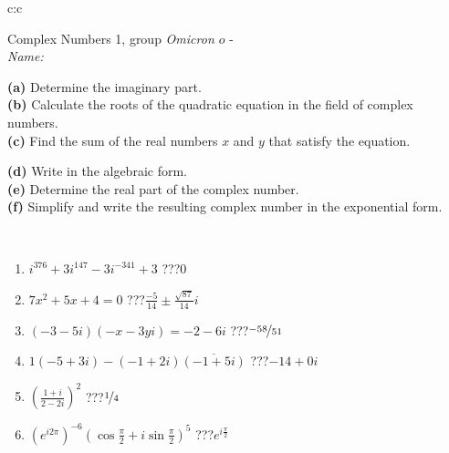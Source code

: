 \documentclass[10pt]{report}
\newcommand\omicron{o}
\begin{document}
\begin{tabular}{c:c}
\begin{minipage}[c][104.5mm][t]{0.5\linewidth}
\begin{center}
\vspace{5mm}
{\huge Complex Numbers 1, group \textit{Omicron $\omicron$} -}\\[5mm]
\textit{Name:}\phantom{xxxxxxxxxxxxxxxxxxxxxxxxxxxxxxxxxxxxxxxxxxxxxxxxxxxxxxxxxxxxxxxxx}\\[5mm]
\begin{minipage}{0.95\linewidth}
\begin{center}
{\small \begin{minipage}{0.44\textwidth} \raggedright
\textbf{(a)} Determine the imaginary part. \\[1mm]
\textbf{(b)} Calculate the roots of the quadratic equation in the field of complex numbers. \\[1mm]
\textbf{(c)} Find the sum of the real numbers \(x\) and \(y\) that satisfy the equation. \end{minipage} \begin{minipage}{0.54\textwidth}
\textbf{(d)} Write in the algebraic form. \\[1mm]
\textbf{(e)} Determine the real part of the complex number. \\[1mm]
\textbf{(f)} Simplify and write the resulting complex number in the exponential form.
\end{minipage}
} \vspace{3mm}
\end{center}
\end{minipage}
\\[1mm]
\begin{minipage}{0.79\linewidth}
\begin{center}
\begin{varwidth}{\linewidth}
\setlength{\itemsep}{0pt}
\begin{enumerate}
\large
\item $i^{376}+3i^{147}-3i^{-341}+3$\quad \dotfill\; ???\;\dotfill \quad $0$
\item $7x^2+5x+4=0$\quad \dotfill\; ???\;\dotfill \quad $\frac{-5}{14} \pm{}\frac{ \sqrt{87}}{14}i$
\item $(-3-5i)(-x-3yi)=-2-6i$\quad \dotfill\; ???\;\dotfill \quad $\nicefrac{-58}{51}$
\item $1(-5+3i)-(-1+2i)\overline{(-1+5i)}$\quad \dotfill\; ???\;\dotfill \quad $-14+0i$
\item $\left(\frac{1+i}{2-2i}\right)^2$\quad \dotfill\; ???\;\dotfill \quad $\nicefrac{1}{4}$
\item $\left(e^{i2\pi}\right)^{-6}\left(\cos{\frac{\pi}{2}}+i\sin{\frac{\pi}{2}}\right)^{5}$\quad \dotfill\; ???\;\dotfill \quad $e^{i\frac{\pi}{2}}$

\end{enumerate}
\end{varwidth}
\end{center}
\end{minipage}
\end{center}
\end{minipage}
\end{tabular}
\end{document}
